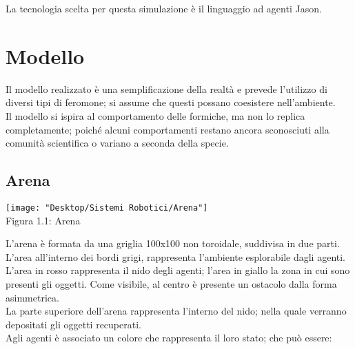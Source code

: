 \documentclass[12pt,a4paper,openright,twoside]{report}
\begin{document}
La tecnologia scelta per questa simulazione è il linguaggio ad agenti Jason.
	\clearpage{\pagestyle{empty}\cleardoublepage}
	\tableofcontents                        %
	\rhead[\fancyplain{}{\bfseries\leftmark}]{\fancyplain{}{\bfseries\thepage}}
	\clearpage{\pagestyle{empty}\cleardoublepage}
	\clearpage{\pagestyle{empty}\cleardoublepage}
	\clearpage{\pagestyle{empty}\cleardoublepage}
	\chapter{Modello}                %
	\lhead[\fancyplain{}{\bfseries\thepage}]{\fancyplain{}{\bfseries\rightmark}}

Il modello realizzato è una semplificazione della realtà e prevede l'utilizzo di diversi tipi di feromone; si assume che questi possano coesistere nell'ambiente.\\
Il modello si ispira al comportamento delle formiche, ma non lo replica completamente; poiché alcuni comportamenti restano ancora sconosciuti alla comunità scientifica o variano a seconda della specie.

\section{Arena}

\begin{center}  
	\texttt{[image: "Desktop/Sistemi Robotici/Arena"]}
	\\Figura 1.1: Arena
\end{center}

L'arena è formata da una griglia 100x100 non toroidale, suddivisa in due parti.\\
L'area all'interno dei bordi grigi, rappresenta l'ambiente esplorabile dagli agenti. L'area in rosso rappresenta il nido degli agenti; l'area in giallo la zona in cui sono presenti gli oggetti. Come visibile, al centro è presente un ostacolo dalla forma asimmetrica.\\
La parte superiore dell'arena rappresenta l'interno del nido; nella quale verranno depositati gli oggetti recuperati.\\
Agli agenti è associato un colore che rappresenta il loro stato; che può essere:
\end{document}
